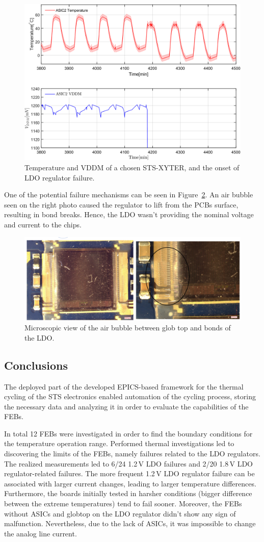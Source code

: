 \begin{figure}[!h]
\centering
\includegraphics[width=0.6\columnwidth]{Chapter4/images/FEB2ASIC2COMP1.png}
\caption{Temperature and VDDM of a chosen STS-XYTER, and the onset of \gls{LDO} regulator failure.}
\label{fig_active_failure}
\end{figure}
\newpage
One of the potential failure mechanisms can be seen in Figure~\ref{fig_ldo_lift}. An air bubble seen on the right photo caused the regulator to lift from the \glspl{PCB} surface, resulting in bond breaks. Hence, the \gls{LDO} wasn't providing the nominal voltage and current to the chips. 

\begin{figure}[!h]
\centering
\includegraphics[width=0.8\columnwidth]{Chapter4/images/FEB_81_LDO_lift.png}
\caption{Microscopic view of the air bubble between glob top and bonds of the \gls{LDO}.}
\label{fig_ldo_lift}
\end{figure}
\newpage
\subsection{Conclusions}
The deployed part of the developed EPICS-based framework for the thermal cycling of the \gls{STS} electronics enabled automation of the cycling process, storing the necessary data and analyzing it in order to evaluate the capabilities of the \glspl{FEB}. 

In total 12 \glspl{FEB} were investigated in order to find the boundary conditions for the temperature operation range. Performed thermal investigations led to discovering the limits of the \glspl{FEB}, namely failures related to the \gls{LDO} regulators. The realized measurements led to 6/24 1.2\,V \gls{LDO} failures and 2/20 1.8\,V \gls{LDO} regulator-related failures. The more frequent 1.2\,V \gls{LDO} regulator failure can be associated with larger current changes, leading to larger temperature differences. Furthermore, the boards initially tested in harsher conditions (bigger difference between the extreme temperatures) tend to fail sooner. Moreover, the \glspl{FEB} without \glspl{ASIC} and globtop on the LDO regulator didn’t show any sign of malfunction. Nevertheless, due to the lack of \glspl{ASIC}, it was impossible to change the analog line current.

